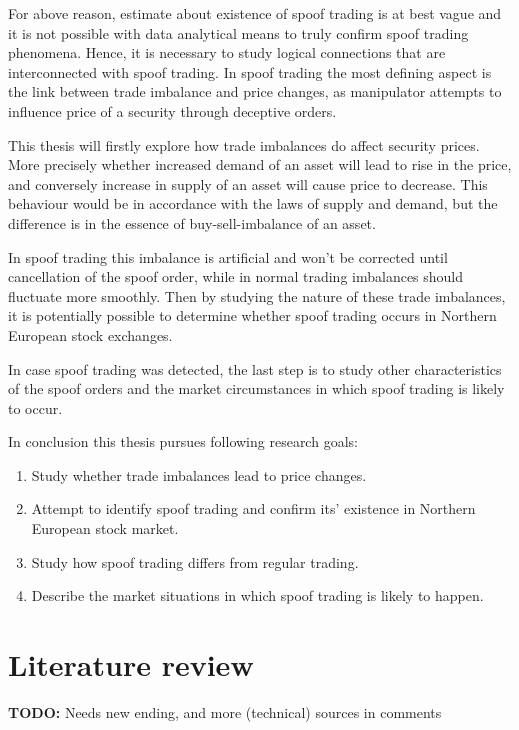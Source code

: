 \documentclass{tut-thesis}
\begin{document}
For above reason, estimate about existence of spoof trading is at best vague and it is not possible with data analytical means to truly confirm spoof trading phenomena. Hence, it is necessary to study logical connections that are interconnected with spoof trading. In spoof trading the most defining aspect is the link between trade imbalance and price changes, as manipulator attempts to influence price of a security through deceptive orders.

This thesis will firstly explore how trade imbalances do affect security prices. More precisely whether increased demand of an asset will lead to rise in the price, and conversely increase in supply of an asset will cause price to decrease. This behaviour would be in accordance with the laws of supply and demand, but the difference is in the essence of buy-sell-imbalance of an asset. 

In spoof trading this imbalance is artificial and won't be corrected until cancellation of the spoof order, while in normal trading imbalances should fluctuate more smoothly. Then by studying the nature of these trade imbalances, it is potentially possible to determine whether spoof trading occurs in Northern European stock exchanges. 

In case spoof trading was detected, the last step is to study other characteristics of the spoof orders and the market circumstances in which spoof trading is likely to occur.

In conclusion this thesis pursues following research goals:
\begin{enumerate}
	\item Study whether trade imbalances lead to price changes.
	\item Attempt to identify spoof trading and confirm its' existence in Northern European stock market.
	\item Study how spoof trading differs from regular trading.
	\item Describe the market situations in which spoof trading is likely to happen.
\end{enumerate}

\section{Literature review}
\textbf{TODO:} Needs new ending, and more (technical) sources in comments
\end{document}
